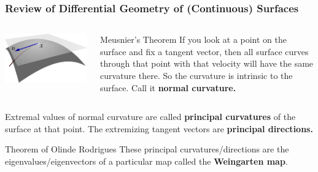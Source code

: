 \documentclass[9pt]{beamer}
\begin{document}
\begin{frame}
\frametitle{Review of Differential Geometry of (Continuous) Surfaces}
  \begin{columns}
    \begin{column}{0.3\textwidth}
      \includegraphics[width=\textwidth]{stolen_surface_tangent}
    \end{column}
    \begin{column}{0.7\textwidth}
  \begin{block}{Meusnier's Theorem}
          If you look at a point on the surface and fix a tangent vector,
          then all surface curves through that point with that velocity
          will have the same curvature there.
          So the curvature is intrinsic to the surface. Call it
          \textbf{normal curvature.}
  \end{block}
\end{column}
\end{columns}
\begin{definition}
   Extremal values of normal curvature are called \textbf{principal curvatures}
   of the surface at that point.
   The extremizing tangent vectors are \textbf{principal directions.}
\end{definition}

\begin{block}{Theorem of Olinde Rodrigues}
  These principal curvatures/directions are
  the eigenvalues/eigenvectors of a particular map called the \textbf{Weingarten map}.
\end{block}
\end{frame}
\end{document}

